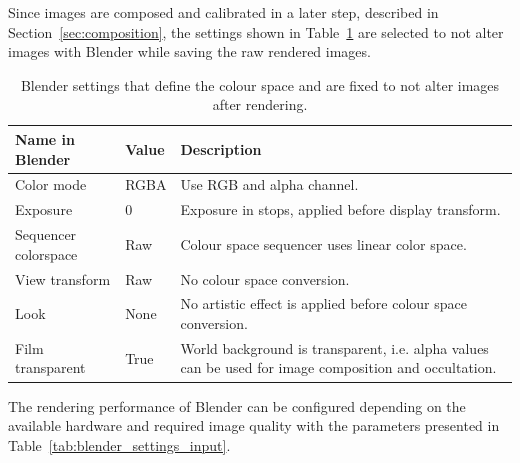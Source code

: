 Since images are composed and calibrated in a later step, described in Section~\ref{sec:composition}, the settings shown in Table~\ref{tab:color_space} are selected to not alter images with Blender while saving the raw rendered images.
\begin{table}[htb]
    \centering
    \caption{Blender settings that define the colour space and are fixed to not alter images after rendering.}
    \label{tab:color_space}
    \begin{tabular}{p{}|p{}|p{}}
        \textbf{Name in Blender}        & \textbf{Value} & \textbf{Description} \\ \hline
        Color mode           & RGBA           & Use RGB and alpha channel. \\
        Exposure             & 0              & Exposure in stops, applied before display transform. \\
        Sequencer colorspace & Raw            & Colour space sequencer uses linear color space. \\
        View transform       & Raw            & No colour space conversion. \\
        Look                 & None           & No artistic effect is applied before colour space conversion. \\
        Film transparent     & True           & World background is transparent, i.e. alpha values can be used for image composition and occultation.
    \end{tabular}
\end{table}

The rendering performance of Blender can be configured depending on the available hardware and required image quality with the parameters presented in Table~\ref{tab:blender_settings_input}.
\begin{table}[htb]
    \centering
    \caption{Input parameters that affect rendering performance and image quality in~\gls{sispo}.}
    \label{tab:blender_settings_input}
\end{table}

